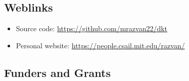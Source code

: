 \documentclass[portrait,a0,final,20pt]{a0poster}
\begin{document}
\begin{multicols}{2}

\Large{

\raggedcolumns	



\subsection*{Weblinks}
\begin{itemize}
\item Source code: \url{https://github.com/mrazvan22/dkt}
\item Personal website: \url{https://people.csail.mit.edu/razvan/}
\end{itemize}
}


\columnbreak

\subsection*{Funders and Grants}


\end{multicols}
\end{document}
